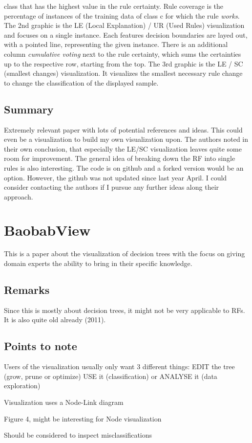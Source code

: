 \documentclass[a4paper, 12pt]{article}
\begin{document}
class that has the highest value in the rule certainty. Rule coverage is the percentage of instances of the
training data of class c for which the rule \textit{works}.
The 2nd graphic is the LE (Local Explanation) / UR (Used Rules) visualization and focuses on a single instance.
Each features decision boundaries are layed out, with a pointed line, representing the given instance.
There is an additional column \textit{cumulative voting} next to the rule certainty, which sums the certainties
up to the respective row, starting from the top.
The 3rd graphic is the LE / SC (smallest changes) visualization. It visualizes the smallest necessary rule change
to change the classification of the displayed sample.

\subsection{Summary}
Extremely relevant paper with lots of potential references and ideas. This could even be a visualization to build
my own visualization upon. The authors noted in their own conclusion, that especially the LE/SC visualization
leaves quite some room for improvement. The general idea of breaking down the RF into single rules is also
interesting. The code is on github and a forked version would be an option. However, the github was not updated
since last year April. I could consider contacting the authors if I pursue any further ideas along their approach.

\section{BaobabView}
This \cite{van2011baobabview} is a paper about the visualization of decision trees with the focus on giving domain
experts the ability to bring in their specific knowledge.
\subsection{Remarks}
Since this is mostly about decision trees, it might not be very applicable to RFs. It is also quite old already
(2011).
\subsection{Points to note}
\begin{description}[font=$\bullet$~\normalfont]
        \item[User requirements]Users of the visualization usually only want 3 different things: EDIT the tree (grow,
        prune or optimize) USE it (classification) or ANALYSE it (data exploration)
        \item [Node-Link diagram:] Visualization uses a Node-Link diagram
        \item [Streamgraphs:]Figure 4, might be interesting for Node visualization
        \item [Confusion Matrix:]Should be considered to inspect misclassifications
\end{description}
\end{document}
